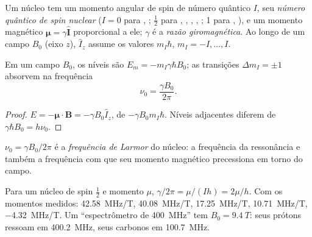 \begin{definition}\label{def:b3:advanced-nmr:nuclear-spin}
Um núcleo tem um momento angular de spin de número quântico $I$, seu
\emph{número quântico de spin nuclear} ($I = 0$
para , ; $\frac12$ para , , , ,
; 1 para , ), e um momento magnético $\boldsymbol\mu = \gamma\hat{\mathbf
I}$ proporcional a ele; $\gamma$ é a \emph{razão giromagnética}.
Ao longo de um campo $B_0$ (eixo $z$), $\hat I_z$ assume os valores $m_I\hbar$,
$m_I = -I, \dots, I$.
\end{definition}

\begin{proposition}\label{prop:b3:advanced-nmr:zeeman}
Em um campo $B_0$, os níveis são $E_m = -m_I\gamma\hbar B_0$; as transições $\Delta m_I = \pm1$
absorvem na frequência
\[
\nu_0 = \frac{\gamma B_0}{2\pi}.
\]
\end{proposition}

\begin{proof}
$E = -\boldsymbol\mu\cdot\mathbf B = -\gamma B_0\hat I_z$, de  $-\gamma B_0m_I\hbar$. Níveis
adjacentes diferem de $\gamma\hbar B_0 = h\nu_0$.
\end{proof}

\begin{definition}\label{def:b3:advanced-nmr:larmor}
$\nu_0 = \gamma B_0/2\pi$ é a \emph{frequência de Larmor} do
núcleo: a frequência da ressonância e também a frequência com que seu
momento magnético precessiona em torno do campo.
\end{definition}

\begin{example}\label{ex:b3:advanced-nmr:nuclei}
Para um núcleo de spin $\frac12$ e momento $\mu$, $\gamma/2\pi = \mu/(Ih) = 2\mu/h$. Com os
momentos medidos:  \qty{42.58}{MHz/T},  \qty{40.08}{MHz/T}, 
\qty{17.25}{MHz/T},  \qty{10.71}{MHz/T},  \qty{-4.32}{MHz/T}. Um
``espectrômetro de \qty{400}{MHz}'' tem $B_0 = \qty{9.4}{T}$: seus prótons ressoam em
\qty{400.2}{MHz}, seus carbonos em \qty{100.7}{MHz}.
\end{example}

